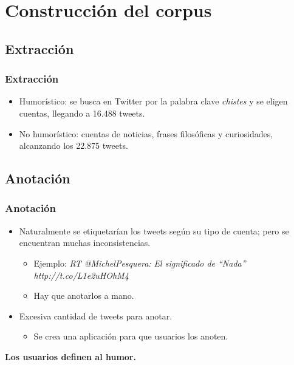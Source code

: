 \section{Construcción del corpus}

\subsection{Extracción}
\begin{frame}
    \frametitle{Extracción}

    \begin{itemize}
        \item Humorístico: se busca en Twitter por la palabra clave \emph{chistes} y se eligen cuentas, llegando a 16.488 tweets.
        \item No humorístico: cuentas de noticias, frases filosóficas y curiosidades, alcanzando los 22.875 tweets.
    \end{itemize}
\end{frame}

\subsection{Anotación}
\begin{frame}
    \frametitle{Anotación}

    \begin{itemize}
        \item Naturalmente se etiquetarían los tweets según su tipo de cuenta; pero se encuentran muchas inconsistencias.

        \begin{itemize}
            \item Ejemplo: \emph{RT @MichelPesquera: El significado de ``Nada'' http://t.co/L1e2uHOhM4}

            \item Hay que anotarlos a mano.
        \end{itemize}

        \item Excesiva cantidad de tweets para anotar.

        \begin{itemize}
            \item Se crea una aplicación para que usuarios los anoten.
        \end{itemize}
    \end{itemize}

    \vspace{1cm}

    \begin{center}
        \bf
        Los usuarios definen al humor.
    \end{center}
\end{frame}

